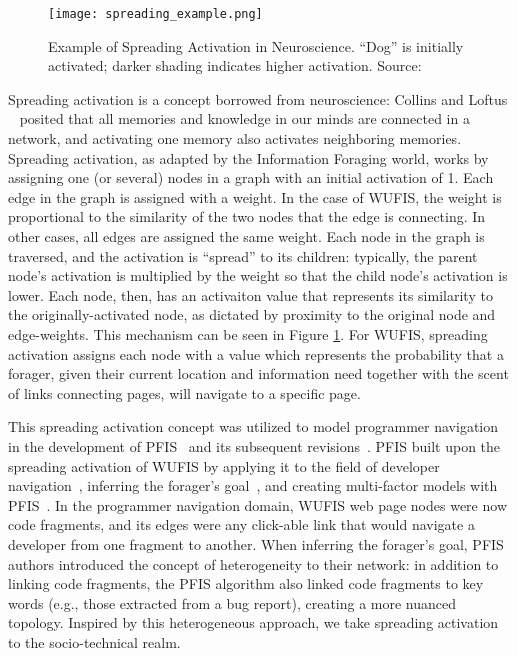 \begin{figure}
	\centering
	\texttt{[image: spreading\_example.png]}
	\caption{Example of Spreading Activation in Neuroscience. ``Dog'' is initially activated; darker shading indicates higher activation. Source: ~\cite{spreadingexample}}
	\label{fig:activation}
\end{figure}

Spreading activation is a concept borrowed from neuroscience: Collins and Loftus ~\cite{spreadingactivation} posited that all memories and knowledge in our minds are connected in a network, and activating one memory also activates neighboring memories. Spreading activation, as adapted by the Information Foraging world, works by assigning one (or several) nodes in a graph with an initial activation of 1. Each edge in the graph is assigned with a weight. In the case of WUFIS, the weight is proportional to the similarity of the two nodes that the edge is connecting. In other cases, all edges are assigned the same weight. Each node in the graph is traversed, and the activation is ``spread'' to its children: typically, the parent node's activation is multiplied by the weight so that the child node's activation is lower. Each node, then, has an activaiton value that represents its similarity to the originally-activated node, as dictated by proximity to the original node and edge-weights. This mechanism can be seen in Figure \ref{fig:activation}. For WUFIS, spreading activation assigns each node with a value which represents the probability that a forager, given their current location and information need together with the scent of links connecting pages, will navigate to a specific page.

This spreading activation concept was utilized to model programmer navigation in the development of PFIS~\cite{pfis1a} and its subsequent revisions~\cite{pfis2,pfis3a}. PFIS built upon the spreading activation of WUFIS by applying it to the field of developer navigation~\cite{pfis1a}, inferring the forager's goal~\cite{pfis2}, and creating multi-factor models with PFIS~\cite{pfis3a}. In the programmer navigation domain, WUFIS web page nodes were now code fragments, and its edges were any click-able link that would navigate a developer from one fragment to another. When inferring the forager's goal, PFIS authors introduced the concept of heterogeneity to their network: in addition to linking code fragments, the PFIS algorithm also linked code fragments to key words (e.g., those extracted from a bug report), creating a more nuanced topology. Inspired by this heterogeneous approach, we take spreading activation to the socio-technical realm.

